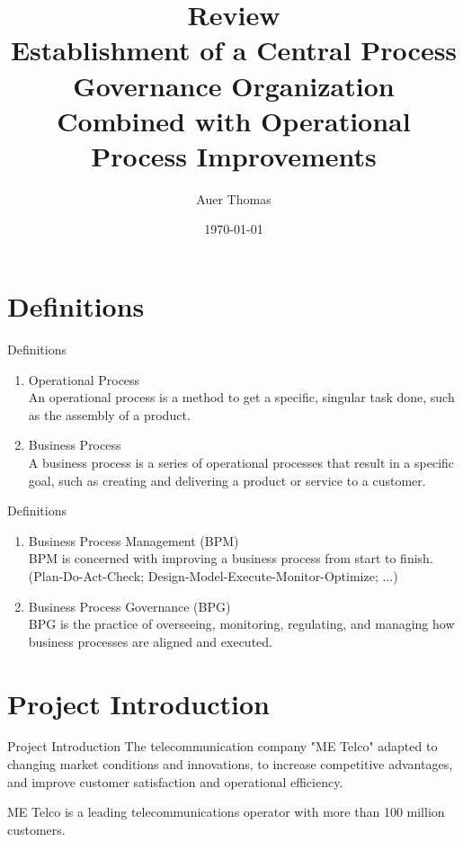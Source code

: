 \documentclass{beamer}
\title{\textbf{Review}\\Establishment of a Central Process Governance Organization Combined with Operational Process Improvements}
\author{Auer Thomas}
\date{\today}
\institute{University of Klagenfurt}
\begin{document}
\frame{\titlepage}

\begin{frame}
    \tableofcontents
\end{frame}



\section{Definitions}
\begin{frame}{Definitions}
    \begin{enumerate}[$\circ$]
        \item Operational Process\\An operational process is a method to get a specific, singular task done, such as the assembly of a product. 
        \item Business Process\\A business process is a series of operational processes that result in a specific goal, such as creating and delivering a product or service to a customer.
    \end{enumerate}    
\end{frame}

\begin{frame}{Definitions}
    \begin{enumerate}[$\circ$]
        \item Business Process Management (BPM)\\BPM is concerned with improving a business process from start to finish. (Plan-Do-Act-Check; Design-Model-Execute-Monitor-Optimize; ...)
        \item Business Process Governance (BPG)\\BPG is the practice of overseeing, monitoring, regulating, and managing how business processes are aligned and executed.
    \end{enumerate}    
\end{frame}


\section{Project Introduction}
\begin{frame}{Project Introduction}
    The telecommunication company "ME Telco" adapted to changing market conditions and innovations, to increase competitive advantages, and improve customer satisfaction and operational efficiency.

    \vspace{1em}

    ME Telco is a leading telecommunications operator with more than 100 million customers.
\end{frame}
\end{document}
